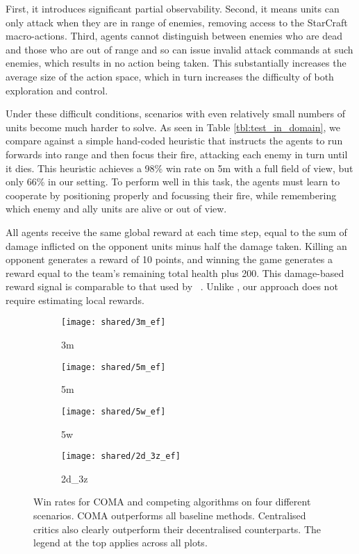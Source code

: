 \documentclass[letterpaper]{article}
\newcommand{\citet}[1]{\citeauthor{#1}~\shortcite{#1}}
\begin{document}
First, it introduces significant partial observability. Second, it means units
can only attack when they are in range of enemies, removing access to the
StarCraft macro-actions. Third, agents cannot distinguish between enemies who
are dead and those who are out of range and so can issue invalid attack commands
at such enemies, which results in no action being taken. This substantially
increases the average size of the  action space, which in turn increases the
difficulty of both exploration and control.

Under these difficult conditions, scenarios with even relatively small numbers
of units become much harder to solve. As seen in Table \ref{tbl:test_in_domain},
we compare against a simple hand-coded heuristic that instructs the agents to
run forwards into range and then focus their fire, attacking each enemy in turn
until it dies. This heuristic achieves a 98\% win rate on 5m with a full field
of view, but only 66\% in our setting. To perform well in this task, the agents
must learn to cooperate by positioning properly and focussing their fire,
while remembering which enemy and ally units are alive or out of
view.

All agents receive the same global reward at each time step, equal to the sum of
damage inflicted on the opponent units minus half the damage taken. Killing an
opponent generates a reward of 10 points, and winning the game generates a
reward equal to the team's remaining total health plus 200. This damage-based
reward signal is comparable to that used by \citet{usunier2016episodic}. Unlike 
\cite{peng2017multiagent}, our approach does not require estimating local 
rewards.

 \begin{figure*}[t!]
 	\centering
 	\begin{subfigure}[b]{0.4\linewidth}
 		\texttt{[image: shared/3m\_ef]}
 		\caption{3m}
 	\end{subfigure}
  	\begin{subfigure}[b]{0.4\linewidth}
	\texttt{[image: shared/5m\_ef]}
 	\caption{5m}
 	\end{subfigure}
 	\begin{subfigure}[b]{0.4\linewidth}
	\texttt{[image: shared/5w\_ef]}
	\caption{5w}
	\end{subfigure}
 	\begin{subfigure}[b]{0.4\linewidth}
\texttt{[image: shared/2d\_3z\_ef]}
	\caption{2d\_3z}

	\end{subfigure}
 	\caption{Win rates for COMA and competing algorithms on four different 
 		scenarios. COMA outperforms all baseline methods. Centralised critics 
 		also
 		clearly outperform their decentralised counterparts. The legend at the 
 		top applies across all plots.}
 	\label{fig:fig_2}
 \end{figure*}
\end{document}
